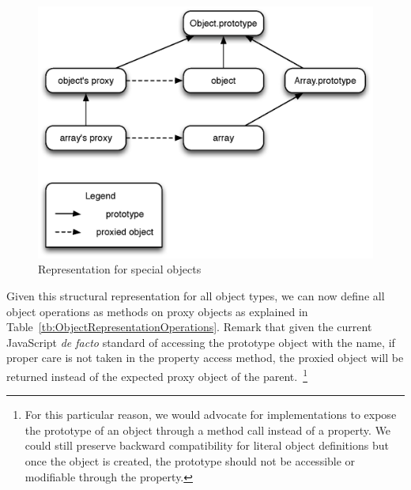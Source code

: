 \begin{figure}[htb]
\begin{center}
\includegraphics[scale=0.75]{figures/specialRepresentation}
\caption{\label{fig:SpecialRepresentation} Representation for special objects}
\end{center}
\end{figure}

Given this structural representation for all object types, we can now define
all object operations as methods on proxy objects as explained in
Table~\ref{tb:ObjectRepresentationOperations}. Remark that given the current
JavaScript \textit{de facto} standard of accessing the prototype object with
the  name, if proper care is not taken in the property access
method, the proxied object will be returned instead of the expected proxy object of
the parent.~\footnote{For this particular reason, we would advocate for
implementations to expose the prototype of an object through a method call
instead of a property. We could still preserve backward compatibility for
literal object definitions but once the object is created, the prototype should
not be accessible or modifiable through the  property.}

